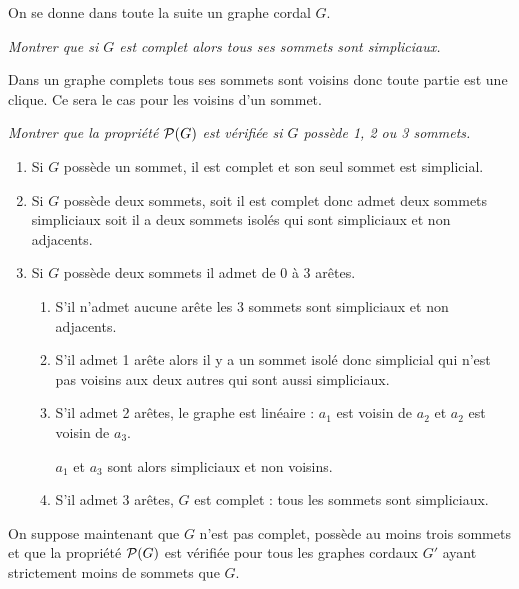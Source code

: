 On se donne dans toute la suite un graphe cordal $G$.
\begin{Exercise}\it
Montrer que si $G$ est complet alors tous ses sommets sont simpliciaux.
\end{Exercise}  
\begin{Answer}
Dans un graphe complets tous ses sommets sont voisins donc toute partie est une clique. Ce sera le cas pour les voisins d'un sommet.
\end{Answer}
\begin{Exercise}\it
Montrer que la propriété ${\cal P}(G)$ est vérifiée si $G$ possède 1, 2 ou 3 sommets.
\end{Exercise}  
\begin{Answer}
\begin{enumerate}
\item Si $G$ possède un sommet, il est complet et son seul sommet est simplicial.
\item Si $G$ possède deux sommets, soit il est complet donc admet deux sommets simpliciaux soit il a deux sommets isolés qui sont simpliciaux et non adjacents.
\item Si $G$ possède deux sommets il admet de 0 à 3 arêtes.
\begin{enumerate}
  \item S'il n'admet aucune arête les 3 sommets sont simpliciaux et non adjacents.
  \item S'il admet 1 arête alors il y a un sommet isolé donc simplicial qui n'est pas voisins aux deux autres qui sont aussi simpliciaux.
  \item S'il admet 2 arêtes, le graphe est linéaire : $a_1$ est voisin de $a_2$ et $a_2$ est voisin de $a_3$.
  
  $a_1$ et $a_3$ sont alors simpliciaux et non voisins.
  \item S'il admet 3 arêtes, $G$ est complet : tous les sommets sont simpliciaux.
\end{enumerate}
\end{enumerate}
\end{Answer}
On suppose maintenant que $G$ n'est pas complet, possède au moins trois sommets et que la propriété ${\cal P}(G)$ est vérifiée pour tous les graphes cordaux $G'$ ayant strictement moins de sommets que $G$. 

